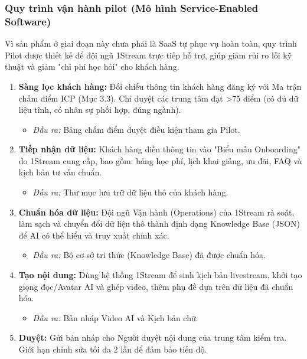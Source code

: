 \subsubsection{Quy trình vận hành pilot (Mô hình Service-Enabled Software)}

Vì sản phẩm ở giai đoạn này chưa phải là SaaS tự phục vụ hoàn toàn, quy trình Pilot được thiết kế để đội ngũ 1Stream trực tiếp hỗ trợ, giúp giảm rủi ro lỗi kỹ thuật và giảm "chi phí học hỏi" cho khách hàng.

\begin{enumerate}
    \item \textbf{Sàng lọc khách hàng:} Đối chiếu thông tin khách hàng đăng ký với Ma trận chấm điểm ICP (Mục 3.3). Chỉ duyệt các trung tâm đạt >75 điểm (có đủ dữ liệu tĩnh, có nhân sự phối hợp, đúng ngành).
    \begin{itemize}
        \item \textit{Đầu ra:} Bảng chấm điểm duyệt điều kiện tham gia Pilot.
    \end{itemize}
    \item \textbf{Tiếp nhận dữ liệu:} Khách hàng điền thông tin vào "Biểu mẫu Onboarding" do 1Stream cung cấp, bao gồm: bảng học phí, lịch khai giảng, ưu đãi, FAQ và kịch bản tư vấn chuẩn.
    \begin{itemize}
        \item \textit{Đầu ra:} Thư mục lưu trữ dữ liệu thô của khách hàng.
    \end{itemize}
    \item \textbf{Chuẩn hóa dữ liệu:} Đội ngũ Vận hành (Operations) của 1Stream rà soát, làm sạch và chuyển đổi dữ liệu thô thành định dạng Knowledge Base (JSON) để AI có thể hiểu và truy xuất chính xác.
    \begin{itemize}
        \item \textit{Đầu ra:} Bộ cơ sở tri thức (Knowledge Base) đã được chuẩn hóa.
    \end{itemize}
    \item \textbf{Tạo nội dung:} Dùng hệ thống 1Stream để sinh kịch bản livestream, khởi tạo giọng đọc/Avatar AI và ghép video, thêm phụ đề dựa trên dữ liệu đã chuẩn hóa.
    \begin{itemize}
        \item \textit{Đầu ra:} Bản nháp Video AI và Kịch bản chữ.
    \end{itemize}
    \item \textbf{Duyệt:} Gửi bản nháp cho Người duyệt nội dung của trung tâm kiểm tra. Giới hạn chỉnh sửa tối đa 2 lần để đảm bảo tiến độ.

\end{enumerate}
